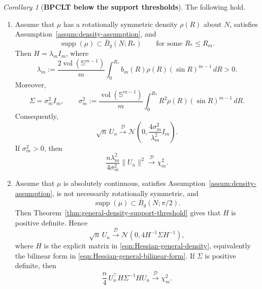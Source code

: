 \documentclass{amsart}
\theoremstyle{definition}
\theoremstyle{remark}
\newtheorem{corollary}[theorem]{Corollary}
\newcommand\0{\boldsymbol{0}}
\begin{document}
\begin{corollary}[\textbf{BPCLT below the support thresholds}]
\label{cor:bpclt-subthreshold}
The following hold.

\begin{enumerate}
\item[\textup{(i)}]
Assume that \(\mu\) has a rotationally symmetric density \(\rho(R)\) about \(N\), satisfies Assumption~\ref{assum:density-assumption}, and
\[
    \operatorname{supp}(\mu)\subset \overline B_g(N;R_*)
    \qquad\text{for some }R_*\le R_m .
\]
Then \(H=\lambda_m I_m\), where
\[
    \lambda_m
    :=
    \frac{2\operatorname{vol}(\mathbb S^{m-1})}{m}
    \int_0^{R_*}
    b_m(R)\rho(R)(\sin R)^{m-1}\,dR
    >0.
\]
Moreover,
\[
    \Sigma=\sigma_m^2 I_m,
    \qquad
    \sigma_m^2
    :=
    \frac{\operatorname{vol}(\mathbb S^{m-1})}{m}
    \int_0^{R_*}
    R^2\rho(R)(\sin R)^{m-1}\,dR .
\]
Consequently,
\[
    \sqrt n\,U_n
    \xrightarrow{\mathcal D}
    \mathcal N\!\left(0,\frac{4\sigma_m^2}{\lambda_m^2}I_m\right).
\]
If \(\sigma_m^2>0\), then
\[
    \frac{n\lambda_m^2}{4\sigma_m^2}\|U_n\|^2
    \xrightarrow{\mathcal D}
    \chi_m^2 .
\]

\item[\textup{(ii)}]
Assume that \(\mu\) is absolutely continuous, satisfies Assumption~\ref{assum:density-assumption}, is not necessarily rotationally symmetric, and
\[
    \operatorname{supp}(\mu)\subset \overline B_g(N;\pi/2).
\]
Then Theorem~\ref{thm:general-density-support-threshold} gives that \(H\) is positive definite. Hence
\[
    \sqrt n\,U_n
    \xrightarrow{\mathcal D}
    \mathcal N\!\left(0,4H^{-1}\Sigma H^{-1}\right),
\]
where \(H\) is the explicit matrix in \eqref{eqn:Hessian-general-density}, equivalently the bilinear form in \eqref{eqn:Hessian-general-bilinear-form}. If \(\Sigma\) is positive definite, then
\[
    \frac n4\,U_n^\top H\Sigma^{-1}HU_n
    \xrightarrow{\mathcal D}
    \chi_m^2 .
\]
\end{enumerate}
\end{corollary}
\end{document}

